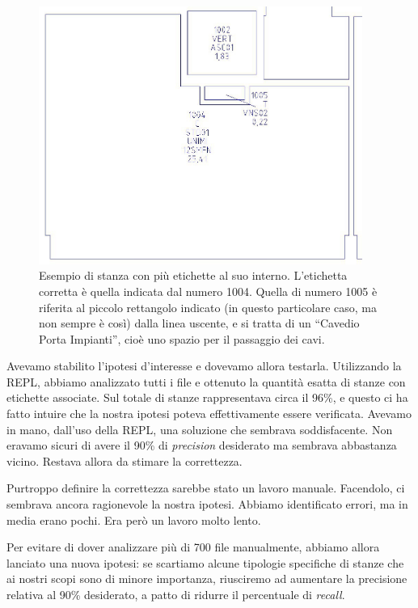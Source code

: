 \documentclass[12pt]{report}
\begin{document}
\begin{figure}[H]
    \centering
    \includegraphics[width=300pt,natwidth=945,natheight=753]{03-dxf-stanza-etichette-fuori.jpg}
    \caption{Esempio di stanza con più etichette al suo interno. L'etichetta 
    corretta è quella indicata dal numero 1004. Quella di numero 1005 è
    riferita al piccolo rettangolo indicato (in questo particolare caso,
    ma non sempre è così) dalla linea uscente, e si tratta di
	un ``Cavedio Porta Impianti'', cioè uno spazio per il passaggio dei cavi.
	}
    \label{fig:dxf_room_labels}
\end{figure}

Avevamo stabilito l'ipotesi d'interesse e dovevamo allora testarla.
Utilizzando la REPL, abbiamo analizzato tutti i file e ottenuto
la quantità esatta di stanze con etichette associate. Sul totale di
stanze rappresentava circa il 96\%, e questo ci ha fatto intuire che
la nostra ipotesi poteva effettivamente essere verificata.
Avevamo in mano, dall'uso della REPL, una soluzione che sembrava 
soddisfacente. Non eravamo sicuri di avere il 90\% di \textit{precision}
desiderato ma sembrava abbastanza vicino. Restava allora da stimare
la correttezza.

Purtroppo definire la correttezza sarebbe stato un lavoro manuale. Facendolo,
ci sembrava ancora ragionevole la nostra ipotesi. Abbiamo identificato errori,
ma in media erano pochi. Era però un lavoro molto lento.

Per evitare di dover analizzare più di 700 file manualmente,
abbiamo allora lanciato una nuova ipotesi: se scartiamo alcune
tipologie specifiche di stanze che ai nostri scopi sono di minore
importanza, riusciremo ad aumentare la precisione relativa al 90\%
desiderato, a patto di ridurre il percentuale di \textit{recall}.
\end{document}
